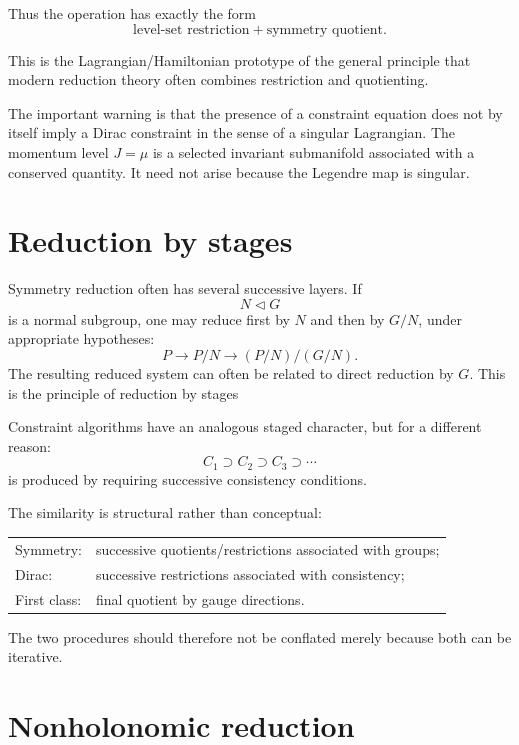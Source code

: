 Thus the operation has exactly the form
\[
        \boxed{
        \text{level-set restriction}
        +
        \text{symmetry quotient}.
        }
\]

This is the Lagrangian/Hamiltonian prototype of the general principle that
modern reduction theory often combines restriction and quotienting.

The important warning is that the presence of a constraint equation does not
by itself imply a Dirac constraint in the sense of a singular Lagrangian.
The momentum level $J=\mu$ is a selected invariant submanifold associated with
a conserved quantity.  It need not arise because the Legendre map is singular.

\section{Reduction by stages}

Symmetry reduction often has several successive layers.  If
\[
        N\triangleleft G
\]
is a normal subgroup, one may reduce first by $N$ and then by $G/N$, under
appropriate hypotheses:
\[
        P
        \longrightarrow
        P/N
        \longrightarrow
        (P/N)/(G/N).
\]
The resulting reduced system can often be related to direct reduction by
$G$.  This is the principle of reduction by stages

Constraint algorithms have an analogous staged character, but for a different
reason:
\[
        C_1\supset C_2\supset C_3\supset\cdots
\]
is produced by requiring successive consistency conditions.

The similarity is structural rather than conceptual:
\begin{center}
\begin{tabular}{ll}
Symmetry: & successive quotients/restrictions associated with groups;\\
Dirac: & successive restrictions associated with consistency;\\
First class: & final quotient by gauge directions.
\end{tabular}
\end{center}

The two procedures should therefore not be conflated merely because both can
be iterative.

\section{Nonholonomic reduction}

